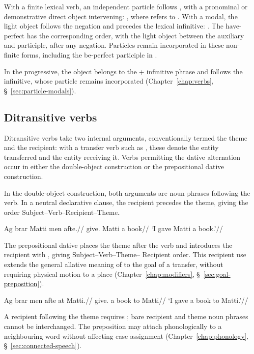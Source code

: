 With a finite lexical verb, an independent particle follows , with a pronominal or demonstrative direct object intervening: , where  refers to . With a modal, the light object follows the negation and precedes the lexical infinitive: . The have-perfect has the corresponding order, with the light object between the auxiliary and participle, after any negation. Particles remain incorporated in these non-finite forms, including the be-perfect participle in .

In the progressive, the object belongs to the  + infinitive phrase and follows the infinitive, whose particle remains incorporated (Chapter~\ref{chap:verbs}, \S~\ref{sec:particle-modals}).

\subsection{Ditransitive verbs}
\label{sec:ditransitive-verbs}

Ditransitive verbs take two internal arguments, conventionally termed the theme and the recipient: with a transfer verb such as , these denote the entity transferred and the entity receiving it. Verbs permitting the dative alternation occur in either the double-object construction or the prepositional dative construction.

In the double-object construction, both arguments are noun phrases following the verb. In a neutral declarative clause, the recipient precedes the theme, giving the order Subject--Verb--Recipient--Theme.

\pex
\begingl
\gla Ag brar Matti men afte.//
\glb \First{}\Sg{} give.\Pst{} Matti a book//
\glft `I gave Matti a book.'//
\endgl
\xe

The prepositional dative places the theme after the verb and introduces the recipient with , giving Subject--Verb--Theme-- Recipient order. This recipient use extends the general allative meaning of  to the goal of a transfer, without requiring physical motion to a place (Chapter~\ref{chap:modifiers}, \S~\ref{sec:goal-preposition}).

\pex
\begingl
\gla Ag brar men afte at Matti.//
\glb \First{}\Sg{} give.\Pst{} a book to Matti//
\glft `I gave a book to Matti.'//
\endgl
\xe

A recipient following the theme requires ; bare recipient and theme noun phrases cannot be interchanged. The preposition may attach phonologically to a neighbouring word without affecting case assignment (Chapter~\ref{chap:phonology}, \S~\ref{sec:connected-speech}).

